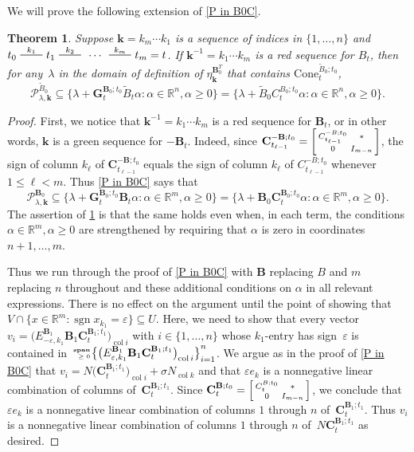 \documentclass{amsart}
\newtheorem{theorem}[proposition]{Theorem}
\theoremstyle{definition}
\theoremstyle{remark}
\numberwithin{equation}{section}
\newcommand{\reals}{\mathbb R}
\newcommand{\edge}{\,\,\rule[2.7pt]{20pt}{0.5pt}\,\,}
\newcommand{\ep}{\varepsilon}
\newcommand{\col}{\operatorname{col}}
\newcommand{\sgn}{\operatorname{sgn}}
\newcommand{\nnspan}{{\!\!\tiny\begin{array}{r}\mathbf{span}\\\ge0\end{array}\hspace*{-0.57em}}}
\newcommand{\set}[1]{{\lbrace #1 \rbrace}}
\newcommand{\sett}[1]{{\bigl\lbrace #1 \bigr\rbrace}}
\newcommand{\GG}{{\mathbf G}}
\newcommand{\CC}{{\mathbf C}}
\newcommand{\0}{{\mathbf{0}}}
\newcommand{\Cone}{\mathrm{Cone}}
\newcommand{\kk}{{\boldsymbol{k}}}
\newcommand{\tB}{{\tilde{B}}}
\newcommand{\BB}{\mathbf{B}}
\renewcommand{\P}{\mathcal{P}}
\begin{document}
We will prove the following extension of \cref{P in B0C}.

\begin{theorem}\label{P in B0C extended}
Suppose $\kk=k_m\cdots k_1$ is a sequence of indices in $\set{1,\ldots, n}$ and $t_0\overset{k_1}{\edge}t_1\overset{k_2}{\edge}\,\cdots\,\overset{k_m}{\edge}t_m=t$.
If $\kk^{-1}=k_1\cdots k_m$ is a red sequence for $B_t$, then for any~$\lambda$ in the domain of definition of $\eta_\kk^{\BB_0^T}$ that contains $\Cone^{\tB_0;t_0}_t$,
\[\P^{\tB_0}_{\lambda,\kk}\subseteq\set{\lambda+\GG_t^{\BB_0;t_0}\tB_t\alpha:\alpha\in\reals^n,\alpha\ge0}=\set{\lambda+\tB_0C_t^{B_0;t_0}\alpha:\alpha\in\reals^n,\alpha\ge0}.\]
\end{theorem}
\begin{proof}
First, we notice that $\kk^{-1}=k_1\cdots k_m$ is a red sequence for $\BB_t$, or in other words, $\kk$ is a green sequence for $-\BB_t$.
Indeed, since $\CC_{t_{\ell-1}}^{-\BB;t_0}=\begin{bsmallmatrix}C_{t_{\ell-1}}^{-B;t_0}&*\\0&I_{m-n}\end{bsmallmatrix}$, the sign of column $k_\ell$ of $\CC_{t_{\ell-1}}^{-\BB;t_0}$ equals the sign of column $k_\ell$ of $C_{t_{\ell-1}}^{-B;t_0}$ whenever $1\le\ell<m$.
Thus \cref{P in B0C} says that
\[\P^{\BB_0}_{\lambda,\kk}\subseteq\set{\lambda+\GG_t^{\BB_0;t_0}\BB_t\alpha:\alpha\in\reals^m,\alpha\ge0}=\set{\lambda+\BB_0\CC_t^{\BB_0;t_0}\alpha:\alpha\in\reals^m,\alpha\ge0}.\]
The assertion of \cref{P in B0C extended} is that the same holds even when, in each term, the conditions $\alpha\in\reals^m,\alpha\ge0$ are strengthened by requiring that $\alpha$ is zero in coordinates $n+1,\ldots,m$.

Thus we run through the proof of \cref{P in B0C} with $\BB$ replacing $B$ and $m$ replacing $n$ throughout and these additional conditions on $\alpha$ in all relevant expressions.
There is no effect on the argument until the point of showing that $V\cap\set{x\in\reals^m:\sgn x_{k_1}=\ep}\subseteq U$.
Here, we need to show that every vector $v_i=\bigl(E^{\BB_1}_{-\ep,k_1}\BB_1\CC_t^{\BB_1;t_1}\bigr)_{\col i}$ with $i\in\set{1,\ldots,n}$ whose $k_1$-entry has sign~$\ep$ is contained in $\nnspan\sett{\bigl(E^{\BB_1}_{\ep,k_1}\BB_1\CC_t^{\BB_1;t_1}\bigr)_{\col i}}_{i=1}^n$.
We argue as in the proof of \cref{P in B0C} that $v_i=N\bigl(\CC_t^{\BB_1;t_1}\bigr)_{\col i}+\sigma N_{\col k}$ and that $\ep e_k$ is a nonnegative linear combination of columns of~$\CC_t^{\BB_1;t_1}$.
Since $\CC_t^{\BB;t_0}=\begin{bsmallmatrix}C_t^{B;t_0}&*\\0&I_{m-n}\end{bsmallmatrix}$, we conclude that $\ep e_k$ is a nonnegative linear combination of columns $1$ through $n$ of~$\CC_t^{\BB_1;t_1}$.
Thus $v_i$ is a nonnegative linear combination of columns $1$ through $n$ of~$N\CC_t^{\BB_1;t_1}$ as desired.
\end{proof}
\end{document}

